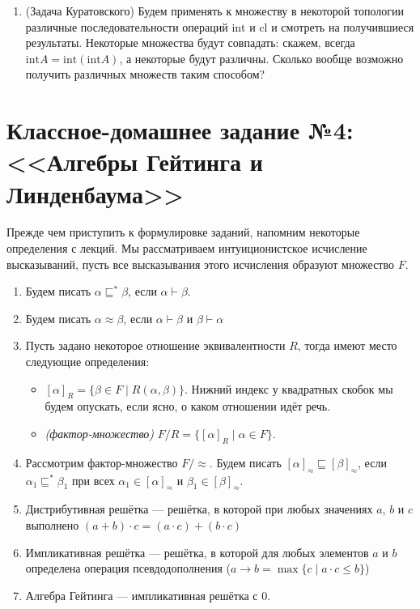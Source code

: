 \documentclass[10pt,a4paper,oneside]{article}
\begin{document}
\begin{enumerate}
\item (Задача Куратовского) Будем применять к множеству в некоторой топологии различные 
последовательности операций $\mathrm{int}$ и $\mathrm{cl}$ и смотреть на получившиеся
результаты. Некоторые множества будут
совпадать: скажем, всегда $\mathrm{int}A = \mathrm{int}(\mathrm{int}A)$, а некоторые будут
различны. Сколько вообще возможно получить различных множеств таким способом?

\end{enumerate}

\section*{Классное-домашнее задание №4: <<Алгебры Гейтинга и Линденбаума>>}

Прежде чем приступить к формулировке заданий, напомним некоторые определения с лекций.
Мы рассматриваем интуиционистское исчисление высказываний, пусть все высказывания этого 
исчисления образуют множество $F$.

\begin{enumerate}
\item Будем писать $\alpha\sqsubseteq^*\beta$, если $\alpha\vdash\beta$.
\item Будем писать $\alpha\approx\beta$, если $\alpha\vdash\beta$ и $\beta\vdash\alpha$
\item Пусть задано некоторое отношение эквивалентности $R$, тогда имеют место следующие определения:
\begin{itemize}
\item $[\alpha]_R = \{\beta\in F \mid R(\alpha,\beta) \}$.
Нижний индекс у квадратных скобок мы будем опускать, если ясно,
о каком отношении идёт речь.
\item \emph{(фактор-множество)} $F/R = \{[\alpha]_R \mid \alpha \in F \}$.
\end{itemize}
\item Рассмотрим фактор-множество $F/\!\!\approx$. Будем писать 
$[\alpha]_\approx\sqsubseteq[\beta]_\approx$, если $\alpha_1\sqsubseteq^*\beta_1$
при всех $\alpha_1\in[\alpha]_\approx$ и $\beta_1\in[\beta]_\approx$. 
\item Дистрибутивная решётка --- решётка, в которой при любых значениях $a$, $b$ и $c$
выполнено $(a+b)\cdot c = (a \cdot c) + (b \cdot c)$
\item Импликативная решётка --- решётка, в которой для любых элементов $a$ и $b$ определена
операция псевдодополнения ($a\rightarrow b = \max \{c \mid a\cdot c\le b\}$)
\item Алгебра Гейтинга --- импликативная решётка с $0$.
\end{enumerate}
\end{document}
